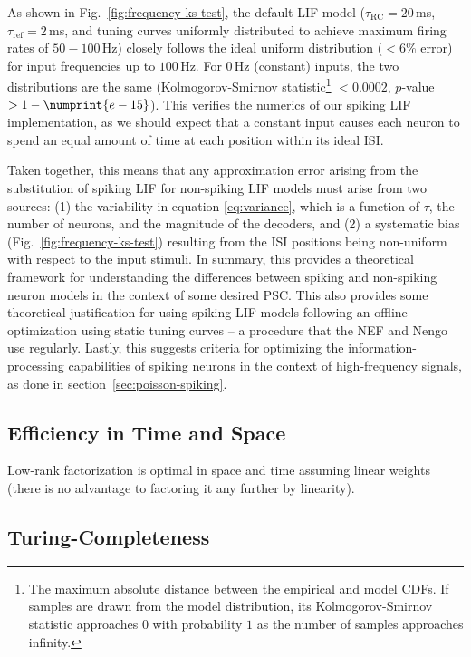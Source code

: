 As shown in Fig.~\ref{fig:frequency-ks-test}, the default LIF model ($\tau_\text{RC} = 20$\,ms, $\tau_\text{ref} = 2$\,ms, and tuning curves uniformly distributed to achieve maximum firing rates of $50-100$\,Hz) closely follows the ideal uniform distribution ($< 6$\% error) for input frequencies up to $100$\,Hz. For $0$\,Hz (constant) inputs, the two distributions are the same (Kolmogorov-Smirnov statistic\footnote{
The maximum absolute distance between the empirical and model CDFs.
If samples are drawn from the model distribution, its Kolmogorov-Smirnov statistic approaches $0$ with probability $1$ as the number of samples approaches infinity.}%
$<0.0002$, $p$-value~$> 1-\numprint{e-15}$).
This verifies the numerics of our spiking LIF implementation, as we should expect that a constant input causes each neuron to spend an equal amount of time at each position within its ideal ISI.

Taken together, this means that any approximation error arising from the substitution of spiking LIF for non-spiking LIF models must arise from two sources: (1) the variability in equation \ref{eq:variance}, which is a function of $\tau$, the number of neurons, and the magnitude of the decoders, and (2) a systematic bias (Fig.~\ref{fig:frequency-ks-test}) resulting from the ISI positions being non-uniform with respect to the input stimuli.
In summary, this provides a theoretical framework for understanding the differences between spiking and non-spiking neuron models in the context of some desired PSC.
This also provides some theoretical justification for using spiking LIF models following an offline optimization using static tuning curves -- a procedure that the NEF and Nengo use regularly.
Lastly, this suggests criteria for optimizing the information-processing capabilities of spiking neurons in the context of high-frequency signals, as done in section~\ref{sec:poisson-spiking}.


\subsection{Efficiency in Time and Space}

Low-rank factorization is optimal in space and time assuming linear weights (there is no advantage to factoring it any further by linearity).

\subsection{Turing-Completeness}


